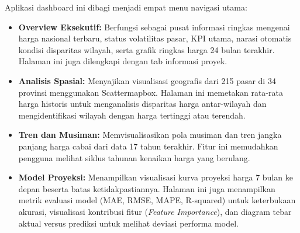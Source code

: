 \documentclass[12pt, a4paper]{article}
\begin{document}
Aplikasi dashboard ini dibagi menjadi empat menu navigasi utama:
\begin{itemize}
    \item \textbf{Overview Eksekutif:} Berfungsi sebagai pusat informasi ringkas mengenai harga nasional terbaru, status volatilitas pasar, KPI utama, narasi otomatis kondisi disparitas wilayah, serta grafik ringkas harga 24 bulan terakhir. Halaman ini juga dilengkapi dengan tab informasi proyek.
    \item \textbf{Analisis Spasial:} Menyajikan visualisasi geografis dari 215 pasar di 34 provinsi menggunakan Scattermapbox. Halaman ini memetakan rata-rata harga historis untuk menganalisis disparitas harga antar-wilayah dan mengidentifikasi wilayah dengan harga tertinggi atau terendah.
    \item \textbf{Tren dan Musiman:} Memvisualisasikan pola musiman dan tren jangka panjang harga cabai dari data 17 tahun terakhir. Fitur ini memudahkan pengguna melihat siklus tahunan kenaikan harga yang berulang.
    \item \textbf{Model Proyeksi:} Menampilkan visualisasi kurva proyeksi harga 7 bulan ke depan beserta batas ketidakpastiannya. Halaman ini juga menampilkan metrik evaluasi model (MAE, RMSE, MAPE, R-squared) untuk keterbukaan akurasi, visualisasi kontribusi fitur (\textit{Feature Importance}), dan diagram tebar aktual versus prediksi untuk melihat deviasi performa model.
\end{itemize}
\end{document}
